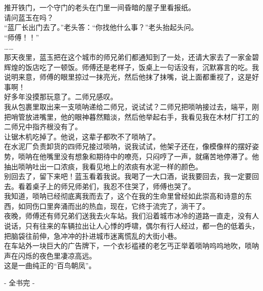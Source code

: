 推开铁门，一个守门的老头在门里一间昏暗的屋子里看报纸。\\

请问蓝玉在吗？\\

“蓝厂长出门去了。”老头答：“你找他什么事？”老头抬起头问。\\

“师傅！！”\\

……\\

那天夜里，蓝玉把在这个城市的师兄弟们都通知到了一处，还请大家去了一家金碧辉煌的饭店吃了一顿饭。师傅还是老样子，饭桌上一句话没有，沉默寡言的吃。我说明来意，师傅的眼里掠过一抹亮光，然后他抹了抹嘴，说上面都重视了，这是好事啊！\\

好多年没摸那玩意了。二师兄感叹。\\

我从包裹里取出来一支唢呐递给二师兄，说试试？二师兄把唢呐接过去，端平，刚把哨管放进嘴里，他的眼神暮然黯淡，然后他举起右手，我看见我在木材厂打工的二师兄中指齐根没有了。\\

让锯木机吃掉了。他说，这辈子都吹不了唢呐了。\\

在水泥厂负责卸货的四师兄接过唢呐，说我试试，他架子还在，像模像样的摆好姿势，唢呐在他嘴里没有想象和期待中的嘹亮，只闷哼了一声，就痛苦地停滞了。他抽出唢呐吐出一口浓痰，我看见地上的浓痰有水泥一样的颜色。\\

别回去了，留下来吧！蓝玉看着我说。我喝了一大口酒，说我要回去，我一定要回去。看着桌子上的师兄师弟们，我忍不住哭了，师傅也哭了。\\

我知道，唢呐已经彻底离我而去了，这个在我的生命里曾经如此崇高和诗意的东西，如同伤口里奔涌而出的热血，现在，它终于流完了，淌干了。\\

夜晚，师傅还有师兄弟们送我去火车站。我们沿着城市冰冷的道路一直走，没有人说话，只有往来的车辆拉出让人心悸的呼啸，偶尔有行人经过，都一色的低着头，把脑袋往前伸，急冲冲的扑进城市迷离慌乱的大街小巷。\\

在车站外一块巨大的广告牌下，一个衣衫褴褛的老乞丐正举着唢呐呜呜地吹，唢呐声在闪烁的夜色里凄凉高远。\\

这是一曲纯正的“百鸟朝凤”。\\

\begin{center}
	- 全书完 -
\end{center}